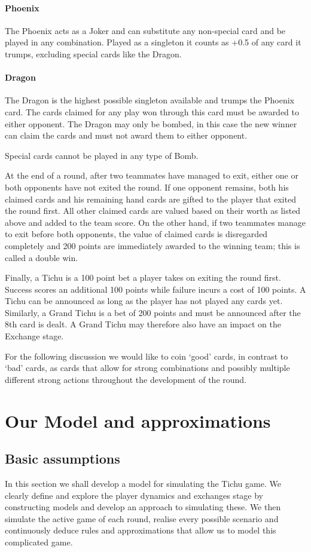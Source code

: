 \paragraph*{Phoenix}
The Phoenix acts as a Joker and can substitute any non-special card and be played in any combination. Played as a singleton it counts as +0.5 of any card it trumps, excluding special cards like the Dragon.
\paragraph{Dragon}
The Dragon is the highest possible singleton available and trumps the Phoenix card. The cards claimed for any play won through this card must be awarded to either opponent. The Dragon may only be bombed, in this case the new winner can claim the cards and must not award them to either opponent.

Special cards cannot be played in any type of Bomb.

At the end of a round, after two teammates have managed to exit, either one or both opponents have not exited the round. If one opponent remains, both his claimed cards and his remaining hand cards are gifted to the player that exited the round first. All other claimed cards are valued based on their worth as listed above and added to the team score. On the other hand, if two teammates manage to exit before both opponents, the value of claimed cards is disregarded completely and 200 points are immediately awarded to the winning team; this is called a double win.

Finally, a Tichu is a 100 point bet a player takes on exiting the round first. Success scores an additional 100 points while failure incurs a cost of 100 points. A Tichu can be announced as long as the player has not played any cards yet. Similarly, a Grand Tichu is a bet of 200 points and must be announced after the 8th card is dealt. A Grand Tichu may therefore also have an impact on the Exchange stage.

For the following discussion we would like to coin ‘good’ cards, in contrast to ‘bad’ cards, as cards that allow for strong combinations and possibly multiple different strong actions throughout the development of the round.


\section{Our Model and approximations}
\subsection{Basic assumptions}
In this section we shall develop a model for simulating the Tichu game. We clearly define and explore the player dynamics and exchanges stage by constructing models and develop an approach to simulating these. We then simulate the active game of each round, realise every possible scenario and continuously deduce rules and approximations that allow us to model this complicated game.

